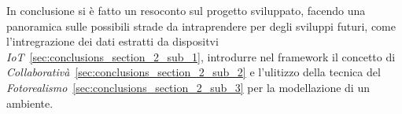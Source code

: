 In conclusione si è fatto un resoconto sul progetto sviluppato, facendo una panoramica sulle possibili strade
da intraprendere per degli sviluppi futuri, come l'intregrazione dei dati estratti da dispositvi
\emph{IoT}~\ref{sec:conclusions_section_2_sub_1},
introdurre nel framework il concetto di \emph{Collaborativà}~\ref{sec:conclusions_section_2_sub_2}
e l'ulitizzo della tecnica del \emph{Fotorealismo}~\ref{sec:conclusions_section_2_sub_3} per la modellazione di un ambiente.
